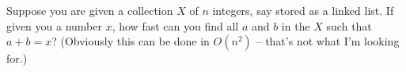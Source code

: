   Suppose you are given a collection $X$ of $n$
  integers, say stored as a linked
  list.
  If given you a number $x$, how fast can you find all $a$ and $b$ in the $X$
  such that $a + b = x$?
  (Obviously this can be done in $O(n^2)$ -- that's not what I'm looking for.)
